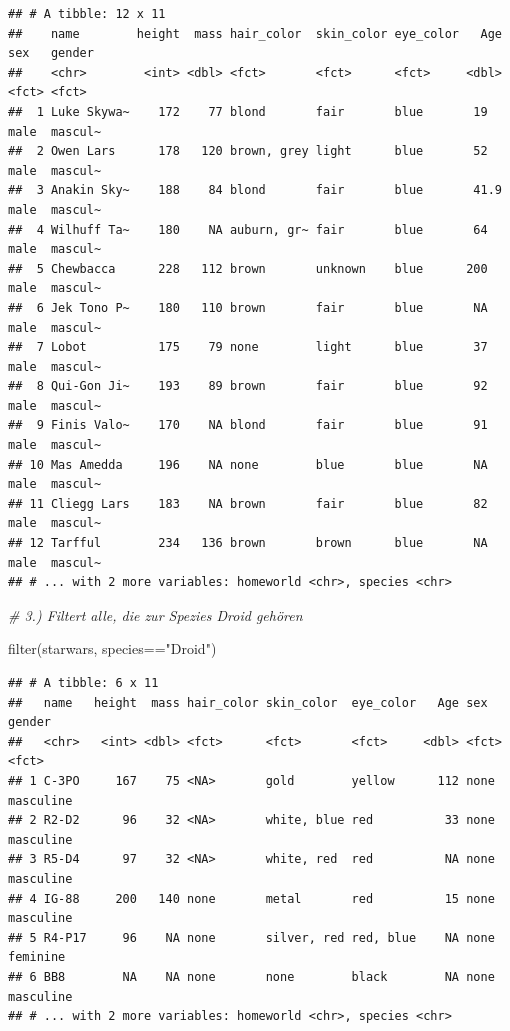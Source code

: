 \documentclass[
]{book}
\newenvironment{Shaded}{\begin{snugshade}}{\end{snugshade}}
\newcommand{\CommentTok}[1]{\textcolor[rgb]{0.56,0.35,0.01}{\textit{#1}}}
\newcommand{\FunctionTok}[1]{\textcolor[rgb]{0.00,0.00,0.00}{#1}}
\newcommand{\NormalTok}[1]{#1}
\newcommand{\SpecialCharTok}[1]{\textcolor[rgb]{0.00,0.00,0.00}{#1}}
\newcommand{\StringTok}[1]{\textcolor[rgb]{0.31,0.60,0.02}{#1}}
\theoremstyle{definition}
\theoremstyle{definition}
\theoremstyle{definition}
\theoremstyle{definition}
\theoremstyle{remark}
\begin{document}
\begin{verbatim}
## # A tibble: 12 x 11
##    name        height  mass hair_color  skin_color eye_color   Age sex   gender 
##    <chr>        <int> <dbl> <fct>       <fct>      <fct>     <dbl> <fct> <fct>  
##  1 Luke Skywa~    172    77 blond       fair       blue       19   male  mascul~
##  2 Owen Lars      178   120 brown, grey light      blue       52   male  mascul~
##  3 Anakin Sky~    188    84 blond       fair       blue       41.9 male  mascul~
##  4 Wilhuff Ta~    180    NA auburn, gr~ fair       blue       64   male  mascul~
##  5 Chewbacca      228   112 brown       unknown    blue      200   male  mascul~
##  6 Jek Tono P~    180   110 brown       fair       blue       NA   male  mascul~
##  7 Lobot          175    79 none        light      blue       37   male  mascul~
##  8 Qui-Gon Ji~    193    89 brown       fair       blue       92   male  mascul~
##  9 Finis Valo~    170    NA blond       fair       blue       91   male  mascul~
## 10 Mas Amedda     196    NA none        blue       blue       NA   male  mascul~
## 11 Cliegg Lars    183    NA brown       fair       blue       82   male  mascul~
## 12 Tarfful        234   136 brown       brown      blue       NA   male  mascul~
## # ... with 2 more variables: homeworld <chr>, species <chr>
\end{verbatim}

\begin{Shaded}
\begin{Highlighting}[]
\CommentTok{\# 3.) Filtert alle, die zur Spezies Droid gehören}

\FunctionTok{filter}\NormalTok{(starwars, species}\SpecialCharTok{==}\StringTok{"Droid"}\NormalTok{)}
\end{Highlighting}
\end{Shaded}

\begin{verbatim}
## # A tibble: 6 x 11
##   name   height  mass hair_color skin_color  eye_color   Age sex   gender   
##   <chr>   <int> <dbl> <fct>      <fct>       <fct>     <dbl> <fct> <fct>    
## 1 C-3PO     167    75 <NA>       gold        yellow      112 none  masculine
## 2 R2-D2      96    32 <NA>       white, blue red          33 none  masculine
## 3 R5-D4      97    32 <NA>       white, red  red          NA none  masculine
## 4 IG-88     200   140 none       metal       red          15 none  masculine
## 5 R4-P17     96    NA none       silver, red red, blue    NA none  feminine 
## 6 BB8        NA    NA none       none        black        NA none  masculine
## # ... with 2 more variables: homeworld <chr>, species <chr>
\end{verbatim}
\end{document}
